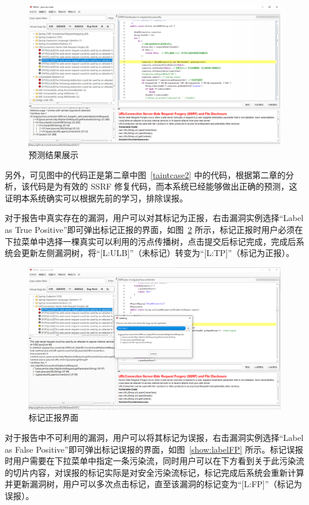 \begin{figure}[H]
    \centering
    \includegraphics[width=0.8\linewidth]{FIGs/chapter4/predictResult.png}
    \caption{预测结果展示}\label{show:predictResult}
\end{figure}

另外，可见图中的代码正是第二章中图~\ref{taintcase2} 中的代码，根据第二章的分析，该代码是为有效的 SSRF 修复代码，而本系统已经能够做出正确的预测，这证明本系统确实可以根据先前的学习，排除误报。

对于报告中真实存在的漏洞，用户可以对其标记为正报，右击漏洞实例选择“Label as True Positive”即可弹出标记正报的界面，如图~\ref{show:labelTP} 所示，标记正报时用户必须在下拉菜单中选择一棵真实可以利用的污点传播树，点击提交后标记完成，完成后系统会更新左侧漏洞树，将“[L:ULB]”（未标记）转变为“[L:TP]”（标记为正报）。

\begin{figure}[H]
    \centering
    \includegraphics[width=0.8\linewidth]{FIGs/chapter4/labelTP.png}
    \caption{标记正报界面}\label{show:labelTP}
\end{figure}

对于报告中不可利用的漏洞，用户可以将其标记为误报，右击漏洞实例选择“Label as False Positive”即可弹出标记误报的界面，如图~\ref{show:labelFP} 所示。标记误报时用户需要在下拉菜单中指定一条污染流，同时用户可以在下方看到关于此污染流的切片内容，对误报的标记实际是对安全污染流标记，标记完成后系统会重新计算并更新漏洞树，用户可以多次点击标记，直至该漏洞的标记变为“[L:FP]”（标记为误报）。


